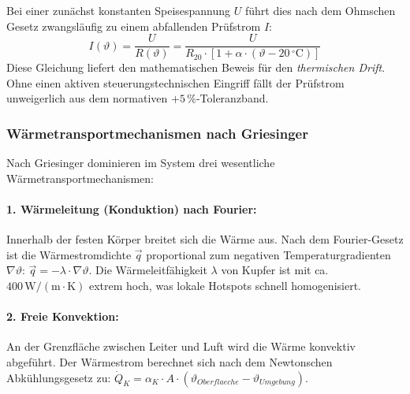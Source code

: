 Bei einer zunächst konstanten Speisespannung $U$ führt dies nach dem Ohmschen Gesetz zwangsläufig zu einem abfallenden Prüfstrom $I$:
\begin{equation}
    I(\vartheta) = \frac{U}{R(\vartheta)} = \frac{U}{R_{20} \cdot \left[ 1 + \alpha \cdot (\vartheta - 20\,^\circ\mathrm{C}) \right]}
    \label{eq:thermischer_drift}
\end{equation}
Diese Gleichung liefert den mathematischen Beweis für den \textit{thermischen Drift}. Ohne einen aktiven steuerungstechnischen Eingriff fällt der Prüfstrom unweigerlich aus dem normativen $+5\,\%$-Toleranzband.
\subsubsection{Wärmetransportmechanismen nach Griesinger}
Nach Griesinger \cite{Griesinger_Waermemanagement} dominieren im System drei wesentliche Wärmetransportmechanismen:
\paragraph{1. Wärmeleitung (Konduktion) nach Fourier:} Innerhalb der festen Körper breitet sich die Wärme aus. Nach dem Fourier-Gesetz ist die Wärmestromdichte $\vec{q}$ proportional zum negativen Temperaturgradienten $\nabla \vartheta$: $\vec{q} = -\lambda \cdot \nabla \vartheta$. Die Wärmeleitfähigkeit $\lambda$ von Kupfer ist mit ca. $400\,\text{W}/(\text{m}\cdot\text{K})$ extrem hoch, was lokale Hotspots schnell homogenisiert.
\paragraph{2. Freie Konvektion:} An der Grenzfläche zwischen Leiter und Luft wird die Wärme konvektiv abgeführt. Der Wärmestrom berechnet sich nach dem Newtonschen Abkühlungsgesetz zu: $\dot{Q}_K = \alpha_K \cdot A \cdot (\vartheta_{Oberflaeche} - \vartheta_{Umgebung})$.
